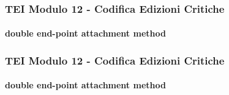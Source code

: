 \begin{frame}
    \frametitle{TEI Modulo 12 - Codifica Edizioni Critiche}
    \framesubtitle{double end-point attachment method}
    \addtocounter{nframe}{1}
    



    \begin{block}{}
      
    \end{block}
    
    \begin{block}{}
       
    \end{block}

\end{frame}


\begin{frame}
    \frametitle{TEI Modulo 12 - Codifica Edizioni Critiche}
    \framesubtitle{double end-point attachment method}
    \addtocounter{nframe}{1}
    


   

    \begin{block}{}
      
    \end{block}
    
    \begin{block}{}
       
    \end{block}

\end{frame}


